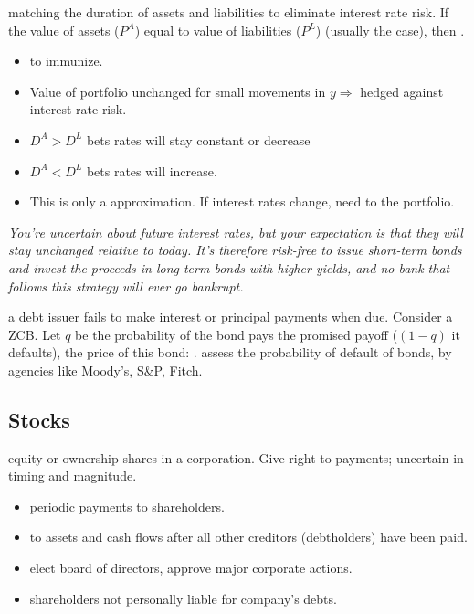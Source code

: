  matching the duration of assets and liabilities to eliminate interest rate risk.
If the value of assets ($P^A$) equal to value of liabilities ($P^L$) (usually the case), then .
\begin{itemize}
    \item {} to immunize.
    \item Value of portfolio unchanged for small movements in $y \Rightarrow$ hedged against interest-rate risk.
    \item $D^A > D^L$ bets rates will stay constant or decrease
    \item $D^A < D^L$ bets rates will increase.
    \item This is only a  approximation. If interest rates change, need to  the portfolio.
\end{itemize}

\textit{You're uncertain about future interest rates, but your expectation is that they will stay unchanged relative to
today. It's therefore risk-free to issue short-term bonds and invest the proceeds in long-term bonds with higher yields,
and no bank that follows this strategy will ever go bankrupt.}

 a debt issuer fails to make interest or principal payments when due.
Consider a ZCB. Let $q$ be the probability of the bond pays the promised payoff (\ie $(1-q)$ it defaults), the price of
this bond:
.
 assess the probability of default of bonds, by agencies like Moody's, S\&P, Fitch.

\subsection{Stocks}

 equity or ownership shares in a corporation. Give right to payments; uncertain in timing and magnitude.
\begin{itemize}
    \item {} periodic payments to shareholders.
    \item {} to assets and cash flows after all other creditors (\eg debtholders) have been paid.
    \item {} elect board of directors, approve major corporate actions.
    \item {} shareholders not personally liable for company's debts.
\end{itemize}

